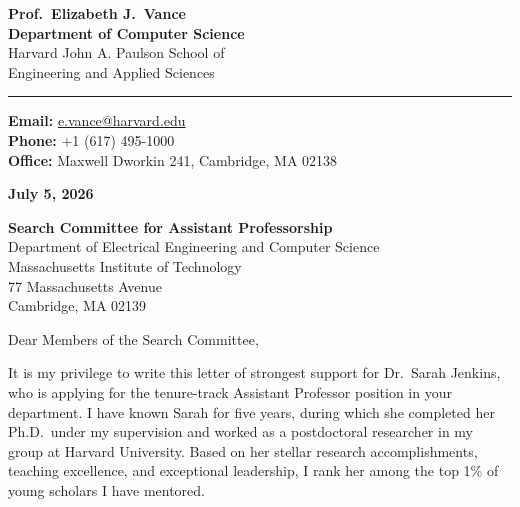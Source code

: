 \documentclass[11pt,letterpaper]{article}
\begin{document}
\noindent
\begin{minipage}[c]{0.52\textwidth}
    \setlength{\parskip}{0pt}
    {\color{accent}\LARGE\bfseries Prof.\ Elizabeth J.\ Vance}\\[0.3em]
    {\color{charcoal}\small\bfseries Department of Computer Science}\\[0.2em]
    {\color{muted}\small Harvard John A. Paulson School of\\Engineering and Applied Sciences}
\end{minipage}%
\hfill
{\color{accent}\rule{1pt}{44pt}}%
\hfill
\begin{minipage}[c]{0.42\textwidth}
    \setlength{\parskip}{0pt}
    \small\color{charcoal}
    \textbf{Email:} \href{mailto:e.vance@harvard.edu}{e.vance@harvard.edu}\\[0.25em]
    \textbf{Phone:} +1 (617) 495-1000\\[0.25em]
    \textbf{Office:} Maxwell Dworkin 241, Cambridge, MA 02138
\end{minipage}

\vspace{1.5em}

\noindent
\textbf{July 5, 2026}

\vspace{0.8em}

\noindent
\textbf{Search Committee for Assistant Professorship}\\
Department of Electrical Engineering and Computer Science\\
Massachusetts Institute of Technology\\
77 Massachusetts Avenue\\
Cambridge, MA 02139

\vspace{0.8em}

\noindent
Dear Members of the Search Committee,

It is my privilege to write this letter of strongest support for Dr.\ Sarah Jenkins, who is applying for the tenure-track Assistant Professor position in your department. I have known Sarah for five years, during which she completed her Ph.D.\ under my supervision and worked as a postdoctoral researcher in my group at Harvard University. Based on her stellar research accomplishments, teaching excellence, and exceptional leadership, I rank her among the top 1\% of young scholars I have mentored.
\end{document}
